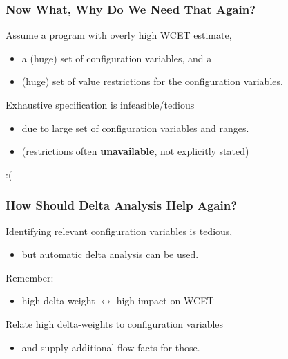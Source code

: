 \documentclass{beamer}
\begin{document}
\begin{frame}[fragile]
  \frametitle{Now What, Why Do We Need That Again?}

  \bigskip
  Assume a program with overly high WCET estimate,
  \begin{itemize}
    \item a (huge) set of configuration variables, and a
    \item (huge) set of value restrictions for the configuration variables.
  \end{itemize}

  \pause 

  \bigskip
  Exhaustive specification is infeasible/tedious
  \begin{itemize}
    \item due to large set of configuration variables and ranges.
    \item (restrictions often {\bf unavailable}, not explicitly stated)
  \end{itemize}

  \bigskip
  :(
\end{frame} 



\begin{frame}[fragile]
  \frametitle{How Should Delta Analysis Help Again?}

  \bigskip
  Identifying relevant configuration variables is tedious,
  \begin{itemize}
    \item but automatic delta analysis can be used.
  \end{itemize}

  \bigskip
  Remember:
  \begin{itemize}
    \item high delta-weight $\leftrightarrow$ high impact on WCET
  \end{itemize}

  \pause

  \bigskip
  Relate high delta-weights to configuration variables
  \begin{itemize}
    \item and supply additional flow facts for those.
  \end{itemize}
\end{frame} 
\end{document}
